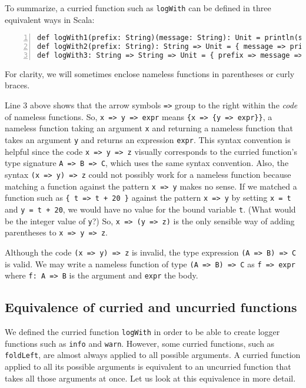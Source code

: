 To summarize, a curried function such as \lstinline!logWith! can
be defined in three equivalent ways in Scala:
\begin{lstlisting}[numbers=left]
def logWith1(prefix: String)(message: String): Unit = println(s"$prefix: $message")
def logWith2(prefix: String): String => Unit = { message => println(s"$prefix: $message") }
def logWith3: String => String => Unit = { prefix => message => println(s"$prefix: $message") }
\end{lstlisting}
For clarity, we will sometimes enclose nameless functions in parentheses
or curly braces. 

Line 3 above shows that the arrow symbols \lstinline!=>! group to
the right within the \emph{code} of nameless functions. So, \lstinline!x => y => expr!
means \lstinline!{x => {y => expr}}!, a nameless function taking
an argument \lstinline!x! and returning a nameless function that
takes an argument \lstinline!y! and returns an expression \lstinline!expr!.
This syntax convention is helpful since the code \lstinline!x => y => z!
visually corresponds to the curried function\textsf{'}s type signature \lstinline!A => B => C!,
which uses the same syntax convention. Also, the syntax \lstinline!(x => y) => z!
could not possibly work for a nameless function because  matching
a function against the pattern \lstinline!x => y! makes no sense.
If we matched a function such as \lstinline!{ t => t + 20 }! against
the pattern \lstinline!x => y! by setting \lstinline!x = t! and
\lstinline!y = t + 20!, we would have no value for the bound variable
\lstinline!t!. (What would be the integer value of \lstinline!y!?)
So, \lstinline!x => (y => z)! is the only sensible way of adding
parentheses to \lstinline!x => y => z!.

Although the code \lstinline!(x => y) => z! is invalid, the type
expression \lstinline!(A => B) => C! is valid. We may write a nameless
function of type \lstinline!(A => B) => C! as \lstinline!f => expr!
where \lstinline!f: A => B! is the argument and \lstinline!expr!
the body.

\subsection{Equivalence of curried and uncurried functions}

We defined the curried function \lstinline!logWith! in order to be
able to create logger functions such as \lstinline!info! and \lstinline!warn!.
However, some curried functions, such as \lstinline!foldLeft!, are
almost always applied to all possible arguments. A curried function
applied to all its possible arguments is equivalent to an uncurried
function that takes all those arguments at once. Let us look at this
equivalence in more detail.

